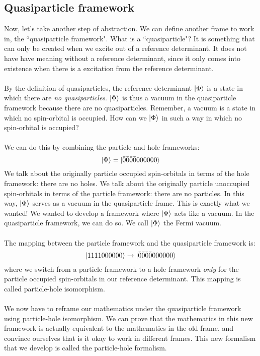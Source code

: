 \documentclass{article}
\newcommand{\kphi}{\ensuremath{\ket{\Phi}} }
\begin{document}
\subsection{Quasiparticle framework}
Now, let's take another step of abstraction. 
We can define another frame to work in, the ``quasiparticle framework". 
What is a ``quasiparticle"? 
It is something that can only be created when we excite out of a reference determinant.
It does not have have meaning without a reference determinant, since it only comes into existence when
there is a excitation from the reference determinant. 
\\ \\
By the definition of quasiparticles, the reference determinant \kphi is a state in which there are \textit{no quasiparticles}.
\kphi is thus a vacuum in the quasiparticle framework because there are no quasiparticles. 
Remember, a vacuum is a state in which no spin-orbital is occupied.
How can we \kphi in such a way in which no spin-orbital is occupied?
\\ \\ 
We can do this by combining the particle and hole frameworks:
\[\kphi =  \ket{\bar{0}\bar{0}\bar{0}\bar{0} 0 0 0 0 0 0} \]
We talk about the originally particle occupied spin-orbitals in terms of the hole framework:
there are no holes.
We talk about the originally particle unoccupied spin-orbitals in terms of the particle framework:
there are no particles.
In this way, \kphi serves as a vacuum in the quasiparticle frame. 
This is exactly what we wanted!
We wanted to develop a framework where \kphi acts like a vacuum.
In the quasiparticle framework, we can do so.
We call \kphi the Fermi vacuum.
\\ \\
The mapping between the particle framework and the quasiparticle framework is: 
\[ \ket{1111000000} \rightarrow  \ket{\bar{0}\bar{0}\bar{0}\bar{0}000000} \]
where we switch from a particle framework to a hole framework \textit{only} for the particle occupied spin-orbitals in our reference determinant. 
This mapping is called particle-hole isomorphism.
\\ \\
We now have to reframe our mathematics under the quasiparticle framework using particle-hole isomorphism.
We can prove that the mathematics in this new framework is actually equivalent to the mathematics in the old frame, and convince ourselves that is it okay
to work in different frames. 
This new formalism that we develop is called the particle-hole formalism.
\end{document}
